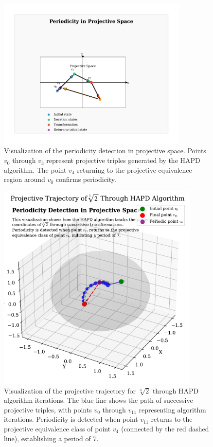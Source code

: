 \begin{figure}[ht]
\centering
\includegraphics[width=0.85\textwidth]{figures/projective_periodicity_visualization.pdf}
\caption{Visualization of the periodicity detection in projective space. Points $v_0$ through $v_3$ represent projective triples generated by the HAPD algorithm. The point $v_4$ returning to the projective equivalence region around $v_0$ confirms periodicity.}
\label{fig:projective_visualization}
\end{figure}

\begin{figure}[ht]
\centering
\includegraphics[width=0.9\textwidth]{figures/projective_trajectory_visualization.pdf}
\caption{Visualization of the projective trajectory for $\sqrt[3]{2}$ through HAPD algorithm iterations. The blue line shows the path of successive projective triples, with points $v_0$ through $v_{11}$ representing algorithm iterations. Periodicity is detected when point $v_{11}$ returns to the projective equivalence class of point $v_4$ (connected by the red dashed line), establishing a period of 7.}
\label{fig:projective_trajectory}
\end{figure}

